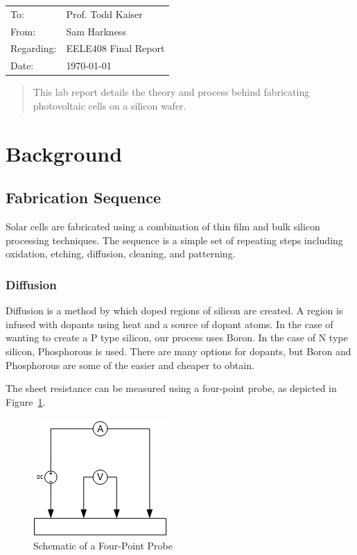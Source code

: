 \documentclass[letter,12pt]{article}
\begin{document}

\begin{flushleft}
	\begin{tabular}{l l}
		To: & Prof. Todd Kaiser \\
		From: & Sam Harkness \\
		Regarding: & EELE408 Final Report \\
		Date: & \mydate\today
	\end{tabular}
\end{flushleft}

\begin{abstract}
	This lab report details the theory and process behind fabricating photovoltaic cells on a silicon wafer.  
\end{abstract}

\section{Background}
	\subsection{Fabrication Sequence}\label{sec:Fab_Sequence}
	
		Solar cells are fabricated using a combination of thin film and bulk silicon processing techniques.  The sequence is a simple set of repeating steps including oxidation, etching, diffusion, cleaning, and patterning.  
	
		\subsubsection{Diffusion}
			\FloatBarrier
			Diffusion is a method by which doped regions of silicon are created.  A region is infused with dopants using heat and a source of dopant atoms.  In the case of wanting to create a P type silicon, our process uses Boron. In the case of N type silicon, Phosphorous is used. There are many options for dopants, but Boron and Phosphorous are some of the easier and cheaper to obtain.
			
		  	The sheet resistance can be measured using a four-point probe, as depicted in Figure~\ref{fig:Four_Point_Probe}.
			
			\begin{figure}[h!]
				\centering
				\includegraphics[scale=1]{./Images/Four_Point_Probe.png}
				\caption{Schematic of a Four-Point Probe}
				\label{fig:Four_Point_Probe}
			\end{figure}
		
\end{document}

